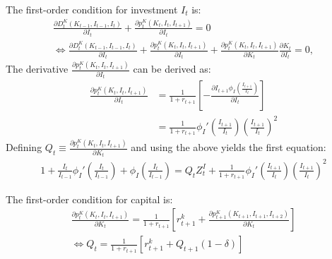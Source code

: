 The first-order condition for investment $I_t$ is:
\begin{gather*}
\frac{\partial D_{t}^{K}\left(K_{t-1},I_{t-1},I_{t}\right)}{\partial I_{t}}+\frac{\partial p_{t}^{K}\left(K_{t},I_{t},I_{t+1}\right)}{\partial I_{t}}=0 \\
\Leftrightarrow\frac{\partial D_{t}^{K}\left(K_{t-1},I_{t-1},I_{t}\right)}{\partial I_{t}}+\frac{\partial p_{t}^{K}\left(K_{t},I_{t},I_{t+1}\right)}{\partial I_{t}}+\frac{\partial p_{t}^{K}\left(K_{t},I_{t},I_{t+1}\right)}{\partial K_{t}}\frac{\partial K_{t}}{\partial I_{t}}=0,
\end{gather*}
The derivative $\frac{\partial p_{t}^{K}\left(K_{t},I_{t},I_{t+1}\right)}{\partial I_{t}}$ can be derived as:
\begin{align*}
\frac{\partial p_{t}^{K}\left(K_{t},I_{t},I_{t+1}\right)}{\partial I_{t}}&=\frac{1}{1+r_{t+1}}\left[-\frac{\partial I_{t+1}\phi_{I}\left(\frac{I_{t+1}}{I_{t}}\right)}{\partial I_{t}}\right] \\
&=\frac{1}{1+r_{t+1}}\phi_{I}'\left(\frac{I_{t+1}}{I_{t}}\right)\left(\frac{I_{t+1}}{I_{t}}\right)^{2}
\end{align*}
Defining $Q_{t} \equiv \frac{\partial p_{t}^{K}\left(K_{t},I_{t},I_{t+1}\right)}{\partial K_{t}}$ and using the above yields the first equation:
\begin{gather*}
1+\frac{I_{t}}{I_{t-1}}\phi_{I}'\left(\frac{I_{t}}{I_{t-1}}\right)+\phi_{I}\left(\frac{I_{t}}{I_{t-1}}\right)=Q_{t}Z_{t}^{I}+\frac{1}{1+r_{t+1}}\phi_{I}'\left(\frac{I_{t+1}}{I_{t}}\right)\left(\frac{I_{t+1}}{I_{t}}\right)^{2}
\end{gather*}

The first-order condition for capital is:
\begin{gather*}
\frac{\partial p_{t}^{K}\left(K_{t},I_{t},I_{t+1}\right)}{\partial K_{t}}=\frac{1}{1+r_{t+1}}\left[r_{t+1}^{k}+\frac{\partial p_{t+1}^{K}\left(K_{t+1},I_{t+1},I_{t+2}\right)}{\partial K_{t}}\right] \\
\Leftrightarrow Q_{t}=\frac{1}{1+r_{t+1}}\left[r_{t+1}^{k}+Q_{t+1}\left(1-\delta\right)\right]
\end{gather*}










